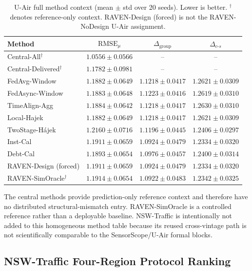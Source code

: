 \begin{table}[!htbp]
\centering
\caption{U-Air full method context (mean $\pm$ std over 20 seeds).
Lower is better.  $^\dagger$ denotes reference-only context.
RAVEN-Design (forced) is not the RAVEN-NoDesign U-Air assignment.}
\label{tab:app_e3_uair}
\scriptsize
\setlength{\tabcolsep}{3pt}
\begin{tabular*}{\columnwidth}{@{\extracolsep{\fill}}lccc}
\toprule
Method & $\mathrm{RMSE}_{\mu}$ & $\Delta_{\mathrm{group}}$ & $\Delta_{c\text{-}s}$\\
\midrule
Central-All$^{\dagger}$ & $1.0556\pm0.0566$ & -- & -- \\
Central-Delivered$^{\dagger}$ & $1.1782\pm0.0981$ & -- & -- \\
FedAvg-Window & $1.1882\pm0.0649$ & $1.1218\pm0.0417$ & $1.2621\pm0.0309$ \\
FedAsync-Window & $1.1883\pm0.0648$ & $1.1223\pm0.0416$ & $1.2619\pm0.0310$ \\
TimeAlign-Agg & $1.1884\pm0.0642$ & $1.1218\pm0.0417$ & $1.2630\pm0.0310$ \\
Local-Hajek & $1.1882\pm0.0649$ & $1.1218\pm0.0417$ & $1.2621\pm0.0309$ \\
TwoStage-H\'ajek & $1.2160\pm0.0716$ & $1.1196\pm0.0445$ & $1.2406\pm0.0297$ \\
Inst-Cal & $1.1911\pm0.0659$ & $1.0924\pm0.0479$ & $1.2334\pm0.0320$ \\
Debt-Cal & $1.1893\pm0.0654$ & $1.0976\pm0.0457$ & $1.2400\pm0.0314$ \\
RAVEN-Design (forced) & $1.1911\pm0.0659$ & $1.0924\pm0.0479$ & $1.2334\pm0.0320$ \\
RAVEN-SimOracle$^{\dagger}$ & $1.1914\pm0.0654$ & $1.0922\pm0.0483$ & $1.2342\pm0.0325$ \\
\bottomrule
\end{tabular*}
\end{table}

The central methods provide prediction-only reference context and therefore
have no distributed structural-mismatch entry.  RAVEN-SimOracle is a controlled
reference rather than a deployable baseline.  NSW-Traffic is intentionally not
added to this homogeneous method table because its reused cross-vintage path is not
scientifically comparable to the SensorScope/U-Air formal blocks.

\subsection{NSW-Traffic Four-Region Protocol Ranking}
\label{app:traffic_four_region}

